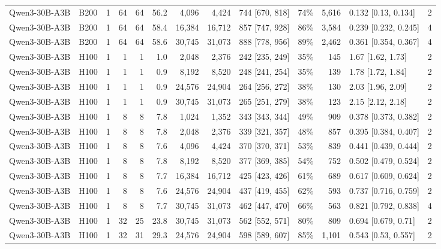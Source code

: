 \begin{landscape}
\begin{longtable}{llrrrrrrlrrlr}
Qwen3-30B-A3B & B200 & 1 & 64 & 64 & 56.2 & 4,096 & 4,424 & 744 {[}670, 818{]} & 74\% & 5,616 & 0.132 {[}0.13, 0.134{]} & 2 \\
Qwen3-30B-A3B & B200 & 1 & 64 & 64 & 58.4 & 16,384 & 16,712 & 857 {[}747, 928{]} & 86\% & 3,584 & 0.239 {[}0.232, 0.245{]} & 4 \\
Qwen3-30B-A3B & B200 & 1 & 64 & 64 & 58.6 & 30,745 & 31,073 & 888 {[}778, 956{]} & 89\% & 2,462 & 0.361 {[}0.354, 0.367{]} & 4 \\
Qwen3-30B-A3B & H100 & 1 & 1 & 1 & 1.0 & 2,048 & 2,376 & 242 {[}235, 249{]} & 35\% & 145 & 1.67 {[}1.62, 1.73{]} & 2 \\
Qwen3-30B-A3B & H100 & 1 & 1 & 1 & 0.9 & 8,192 & 8,520 & 248 {[}241, 254{]} & 35\% & 139 & 1.78 {[}1.72, 1.84{]} & 2 \\
Qwen3-30B-A3B & H100 & 1 & 1 & 1 & 0.9 & 24,576 & 24,904 & 264 {[}256, 272{]} & 38\% & 130 & 2.03 {[}1.96, 2.09{]} & 2 \\
Qwen3-30B-A3B & H100 & 1 & 1 & 1 & 0.9 & 30,745 & 31,073 & 265 {[}251, 279{]} & 38\% & 123 & 2.15 {[}2.12, 2.18{]} & 2 \\
Qwen3-30B-A3B & H100 & 1 & 8 & 8 & 7.8 & 1,024 & 1,352 & 343 {[}343, 344{]} & 49\% & 909 & 0.378 {[}0.373, 0.382{]} & 2 \\
Qwen3-30B-A3B & H100 & 1 & 8 & 8 & 7.8 & 2,048 & 2,376 & 339 {[}321, 357{]} & 48\% & 857 & 0.395 {[}0.384, 0.407{]} & 2 \\
Qwen3-30B-A3B & H100 & 1 & 8 & 8 & 7.6 & 4,096 & 4,424 & 370 {[}370, 371{]} & 53\% & 839 & 0.441 {[}0.439, 0.444{]} & 2 \\
Qwen3-30B-A3B & H100 & 1 & 8 & 8 & 7.8 & 8,192 & 8,520 & 377 {[}369, 385{]} & 54\% & 752 & 0.502 {[}0.479, 0.524{]} & 2 \\
Qwen3-30B-A3B & H100 & 1 & 8 & 8 & 7.7 & 16,384 & 16,712 & 425 {[}423, 426{]} & 61\% & 689 & 0.617 {[}0.609, 0.624{]} & 2 \\
Qwen3-30B-A3B & H100 & 1 & 8 & 8 & 7.6 & 24,576 & 24,904 & 437 {[}419, 455{]} & 62\% & 593 & 0.737 {[}0.716, 0.759{]} & 2 \\
Qwen3-30B-A3B & H100 & 1 & 8 & 8 & 7.7 & 30,745 & 31,073 & 462 {[}447, 470{]} & 66\% & 563 & 0.821 {[}0.792, 0.838{]} & 4 \\
Qwen3-30B-A3B & H100 & 1 & 32 & 25 & 23.8 & 30,745 & 31,073 & 562 {[}552, 571{]} & 80\% & 809 & 0.694 {[}0.679, 0.71{]} & 2 \\
Qwen3-30B-A3B & H100 & 1 & 32 & 31 & 29.3 & 24,576 & 24,904 & 598 {[}589, 607{]} & 85\% & 1,101 & 0.543 {[}0.53, 0.557{]} & 2 \\

\end{longtable}
\end{landscape}
